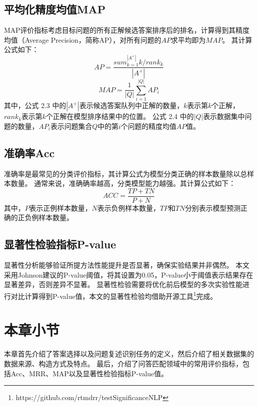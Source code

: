 \subsection{平均化精度均值MAP}

MAP评价指标考虑目标问题的所有正解候选答案排序后的排名，计算得到其精度均值（Average Precision，简称AP），对所有问题的$AP$求平均即为$MAP$。
其计算公式如下：
\begin{equation}
    AP = \frac{sum_{k=1}^{|A^+|}k/rank_k}{|A^+|}
\end{equation}
\begin{equation}
    MAP = \frac{1}{|Q|} \sum_{i=1}^{|Q|}AP_i
\end{equation}
其中，公式 2.3 中的$|A^+|$表示候选答案队列中正解的数量，$k$表示第$k$个正解，$rank_k$表示第$k$个正解在模型排序结果中的位置。
公式 2.4 中的$|Q|$表示数据集中问题的数量，$AP_i$表示问题集合$Q$中的第$i$个问题的精度均值$AP$值。

\subsection{准确率Acc}

准确率是最常见的分类评价指标，其计算公式为模型分类正确的样本数量除以总样本数量。
通常来说，准确确率越高，分类模型能力越强。其计算公式如下：
\begin{equation}
    ACC = \frac{TP + TN}{P + N}
\end{equation}
其中，$P$表示正例样本数量，$N$表示负例样本数量，$TP$和$TN$分别表示模型预测正确的正负例样本数量。


\subsection{显著性检验指标P-value}

显著性分析能够验证所提方法性能提升是否显著，确保实验结果并非偶然。
本文采用Johnson\cite{johnson1999insignificance}建议的P-value阈值，将其设置为0.05，P-value小于阈值表示结果存在显著差异，否则差异不显著。
显著性检验需要将优化前后模型的多次实验性能进行对比计算得到P-value值，本文的显著性检验均借助开源工具\footnote{https://github.com/rtmdrr/testSignificanceNLP}完成。

\section{本章小节}

本章首先介绍了答案选择以及问题复述识别任务的定义，然后介绍了相关数据集的数据来源、构造方式及特点。
最后，介绍了问答匹配领域中的常用评价指标，包括Acc、MRR、MAP以及显著性检验指标P-value值。